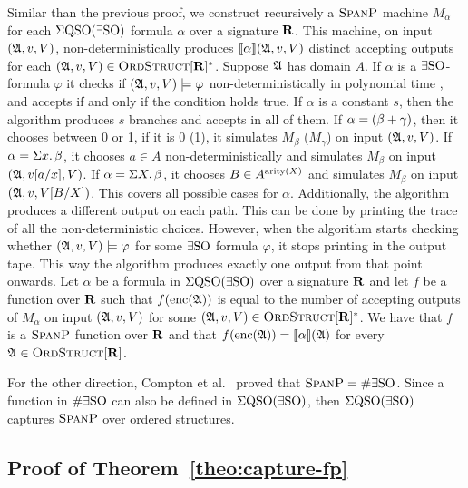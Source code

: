 Similar than the previous proof, we construct recursively a $\text{\sc SpanP}$ machine $M_{\alpha}$ for each $\Sigma{\rm QSO}(\exists{\rm SO})$ formula $\alpha$ over a signature $\mathbf{R}$. This machine, on input $(\mathfrak{A},v,V)$, non-deterministically produces ${\llbracket{}{\alpha}\rrbracket}(\mathfrak{A},v,V)$ distinct accepting outputs for each $(\mathfrak{A},v,V) \in \text{\sc OrdStruct}[\mathbf{R}]^*$. Suppose $\mathfrak{A}$ has domain $A$. 
If $\alpha$ is a $\exists{\rm SO}$-formula $\varphi$ it checks if $(\mathfrak{A},v,V)\models\varphi$ non-deterministically in polynomial time \cite{fagin1974generalized}, and accepts if and only if the condition holds true. 
If $\alpha$ is a constant $s$, then the algorithm produces $s$ branches and accepts in all of them. 
If $\alpha = (\beta + \gamma)$, then it chooses between 0 or 1, if it is 0 (1), it simulates $M_{\beta}$ ($M_{\gamma}$) on input $(\mathfrak{A},v,V)$.  
If $\alpha = \Sigma{x}.\,\beta$, it chooses $a\in A$ non-deterministically and simulates $M_{\beta}$ on input $(\mathfrak{A},v[a/x],V)$. 
If $\alpha = \Sigma{X}.\, \beta$, it chooses $B\in A^{{\rm arity}(X)}$ and simulates $M_{\beta}$ on input $(\mathfrak{A},v,V[B/X])$. 
This covers all possible cases for $\alpha$.
Additionally, the algorithm produces a different output on each path. This can be done by printing the trace of all the non-deterministic choices.
However, when the algorithm starts checking whether $(\mathfrak{A},v,V)\models\varphi$ for some $\exists{\rm SO}$ formula $\varphi$, it stops printing in the output tape. This way the algorithm produces exactly one output from that point onwards.
Let $\alpha$ be a formula in $\Sigma{\rm QSO}(\exists{\rm SO})$ over a signature $\mathbf{R}$ and let $f$ be a function over $\mathbf{R}$ such that $f({\rm enc}(\mathfrak{A}))$ is equal to the number of accepting outputs of $M_{\alpha}$ on input $(\mathfrak{A},v,V)$ for some $(\mathfrak{A},v,V) \in \text{\sc OrdStruct}[\mathbf{R}]^*$. 
We have that $f$ is a $\text{\sc SpanP}$ function over $\mathbf{R}$ and that $f({\rm enc}(\mathfrak{A})) = {\llbracket{}{\alpha}\rrbracket}(\mathfrak{A})$ for every $\mathfrak{A}\in\text{\sc OrdStruct}[\mathbf{R}]$.

For the other direction, Compton et al.~\cite{ComptonG96} proved that $\text{\sc SpanP} = \#\exists{\rm SO}$. Since a function in $\#\exists{\rm SO}$ can also be defined in $\Sigma{\rm QSO}(\exists{\rm SO})$, then $\Sigma{\rm QSO}(\exists{\rm SO})$ captures $\text{\sc SpanP}$ over ordered structures.

\medskip

\subsection*{Proof of Theorem~\ref{theo:capture-fp}}

